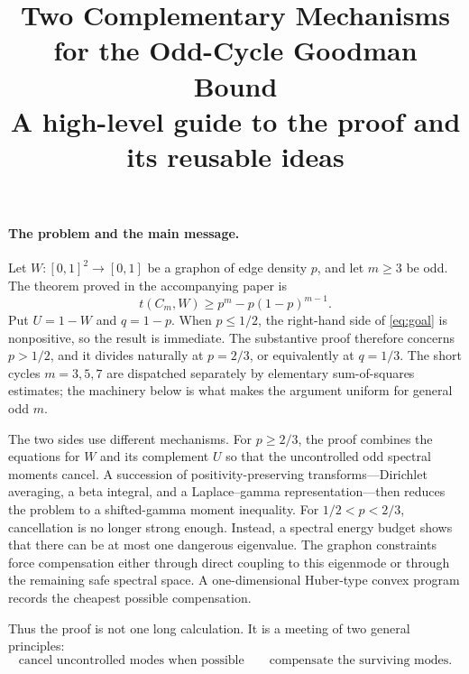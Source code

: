 \documentclass[10pt]{article}
\title{Two Complementary Mechanisms for the Odd-Cycle Goodman Bound\\
\large A high-level guide to the proof and its reusable ideas}
\author{}
\date{}
\begin{document}
\maketitle
\vspace{-2.2em}

\paragraph{The problem and the main message.}
Let $W:[0,1]^2\to[0,1]$ be a graphon of edge density $p$, and let $m\ge3$ be odd.
The theorem proved in the accompanying paper is
\begin{equation}\label{eq:goal}
  t(C_m,W)\ge p^m-p(1-p)^{m-1}.
\end{equation}
Put $U=1-W$ and $q=1-p$.
When $p\le1/2$, the right-hand side of \eqref{eq:goal} is nonpositive, so the result is immediate.
The substantive proof therefore concerns $p>1/2$, and it divides naturally at $p=2/3$, or equivalently at $q=1/3$.
The short cycles $m=3,5,7$ are dispatched separately by elementary sum-of-squares estimates; the machinery below is what makes the argument uniform for general odd $m$.

The two sides use different mechanisms.
For $p\ge2/3$, the proof combines the equations for $W$ and its complement $U$ so that the uncontrolled odd spectral moments cancel.  A succession of positivity-preserving transforms---Dirichlet averaging, a beta integral, and a Laplace--gamma representation---then reduces the problem to a shifted-gamma moment inequality.
For $1/2<p<2/3$, cancellation is no longer strong enough.  Instead, a spectral energy budget shows that there can be at most one dangerous eigenvalue.  The graphon constraints force compensation either through direct coupling to this eigenmode or through the remaining safe spectral space.  A one-dimensional Huber-type convex program records the cheapest possible compensation.

Thus the proof is not one long calculation.  It is a meeting of two general principles:
\[
  \boxed{\text{cancel uncontrolled modes when possible}}
  \qquad
  \boxed{\text{compensate the surviving modes}.}
\]
\end{document}
